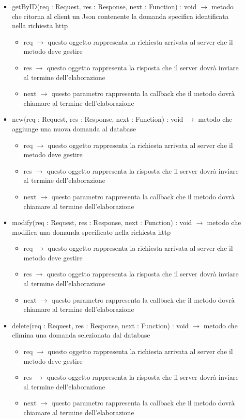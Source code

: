 \begin{description}
\begin{itemize}
	\item getByID(req : Request, res : Response, next : Function) : void $\rightarrow$ metodo che ritorna al client un Json contenente la domanda specifica identificata nella richiesta http\begin{itemize}
		\item req $\rightarrow$ questo oggetto rappresenta la richiesta arrivata al server che il metodo deve gestire
		\item res $\rightarrow$ questo oggetto rappresenta la risposta che il server dovrà inviare al termine dell'elaborazione
		\item next $\rightarrow$ questo parametro rappresenta la callback che il metodo dovrà chiamare al termine dell'elaborazione
	\end{itemize}
	
	\item new(req : Request, res : Response, next : Function) : void $\rightarrow$ metodo che aggiunge una nuova domanda al database\begin{itemize}
		\item req $\rightarrow$ questo oggetto rappresenta la richiesta arrivata al server che il metodo deve gestire
		\item res $\rightarrow$ questo oggetto rappresenta la risposta che il server dovrà inviare al termine dell'elaborazione
		\item next $\rightarrow$ questo parametro rappresenta la callback che il metodo dovrà chiamare al termine dell'elaborazione
	\end{itemize}
	
	\item modify(req : Request, res : Response, next : Function) : void $\rightarrow$ metodo che modifica una domanda specificato nella richiesta http\begin{itemize}
		\item req $\rightarrow$ questo oggetto rappresenta la richiesta arrivata al server che il metodo deve gestire
		\item res $\rightarrow$ questo oggetto rappresenta la risposta che il server dovrà inviare al termine dell'elaborazione
		\item next $\rightarrow$ questo parametro rappresenta la callback che il metodo dovrà chiamare al termine dell'elaborazione
	\end{itemize}
	
	\item delete(req : Request, res : Response, next : Function) : void $\rightarrow$ metodo che elimina una domanda selezionata dal database\begin{itemize}
		\item req $\rightarrow$ questo oggetto rappresenta la richiesta arrivata al server che il metodo deve gestire
		\item res $\rightarrow$ questo oggetto rappresenta la risposta che il server dovrà inviare al termine dell'elaborazione
		\item next $\rightarrow$ questo parametro rappresenta la callback che il metodo dovrà chiamare al termine dell'elaborazione
	\end{itemize}
	

\end{itemize}
\end{description}
